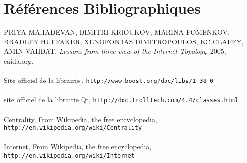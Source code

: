 \section*{R\'ef\'erences Bibliographiques}



\label{bib_3view}
PRIYA MAHADEVAN, DIMITRI KRIOUKOV, MARINA FOMENKOV, BRADLEY HUFFAKER, XENOFONTAS DIMITROPOULOS, KC CLAFFY, AMIN VAHDAT, \textit{Lessons from three view of the Internet Topology}, 2005, caida.org.\\
~\\
\label{bib_boost}
Site officiel de la librairie \boost, \verb|http://www.boost.org/doc/libs/1_38_0|\\
~\\
\label{bib_qt}
site officiel de la librairie Qt, \verb|http://doc.trolltech.com/4.4/classes.html|\\
~\\
\label{bib_wiki_centrality}
Centrality, From Wikipedia, the free encyclopedia, \verb|http://en.wikipedia.org/wiki/Centrality|\\
~\\
\label{bib_wiki_internet}
Internet, From Wikipedia, the free encyclopedia, \verb|http://en.wikipedia.org/wiki/Internet|